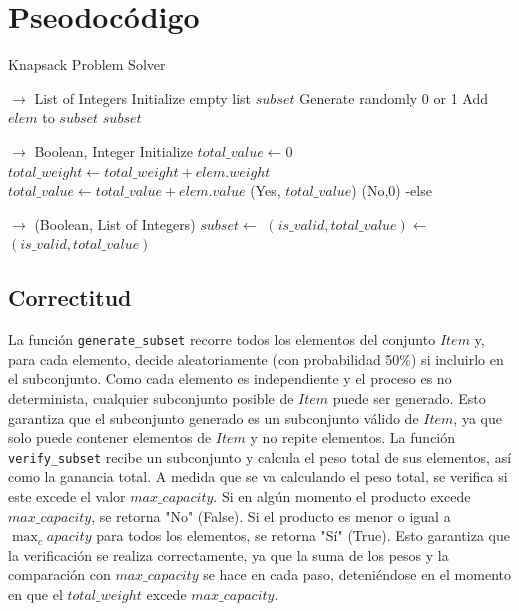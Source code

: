 \documentclass{article}
\begin{document}
\section{Pseodocódigo}
\begin{algorithm}
    \caption{Knapsack Problem Solver}
    \begin{algorithmic}[1]
    
     $\to$ List of Integers
        \State Initialize empty list $subset$
            \State Generate randomly 0 or 1
                \State Add $elem$ to $subset$
            \EndIf
        \EndFor
        \State \Return $subset$
    \EndFunction

     $\to$ {Boolean, Integer}
        \State Initialize $total\_value \gets 0$
            \State $total\_weight \gets total\_weight + elem.weight$
            \State $total\_value \gets total\_value + elem.value$
                \State \Return (Yes, $total\_value$)
            \Else
                \State \Return (No,0)
            \EndIf-else
        \EndFor
    \EndFunction

     $\to$ (Boolean, List of Integers)
        \State $subset \gets$ 
        \State $(is\_valid, total\_value) \gets$ 
        \State \Return $(is\_valid, total\_value)$
    \EndFunction
    \end{algorithmic}
\end{algorithm}
\subsection{Correctitud}
La función \texttt{generate\_subset} recorre todos los elementos del conjunto $Item$ y, para cada elemento, decide aleatoriamente (con probabilidad 50\%) 
si incluirlo en el subconjunto. Como cada elemento es independiente y el proceso es no determinista, cualquier subconjunto posible de $Item$ puede ser generado.
Esto garantiza que el subconjunto generado es un subconjunto válido de $Item$, ya que solo puede contener elementos de $Item$ y no repite elementos.
La función \texttt{verify\_subset} recibe un subconjunto y calcula el peso total de sus elementos, así como la ganancia total. A medida que se va calculando el peso
total, se verifica si este excede el valor $max\_capacity$. Si en algún momento el producto excede $max\_capacity$, se retorna "No" (False). Si el producto es menor o igual a $\max_capacity$ para todos los elementos, se retorna "Sí" (True).
Esto garantiza que la verificación se realiza correctamente, ya que la suma de los pesos y la comparación con $max\_capacity$ se hace en cada paso, deteniéndose en el momento en que el $total\_weight$ excede $max\_capacity$.
\end{document}
